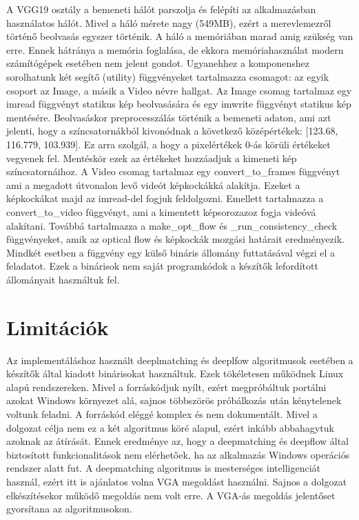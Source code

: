 \documentclass[12pt, a4paper, oneside]{book}
\theoremstyle{tetel}
\newcommand\secro[1]{%
	\addcontentsline{tce}{section}{\protect\makebox[2.8em][l]{\thesection.}#1}}
\newcommand\secen[1]{%
	 \addcontentsline{tcen}{section}{\protect\makebox[2.8em][l]{\thesection.}#1}}
\begin{document}
A VGG19 osztály a bemeneti hálót parszolja és felépíti az alkalmazásban használatos hálót. Mivel a háló mérete nagy (549MB), ezért a merevlemezről történő beolvasás egyszer történik. A háló a memóriában marad amig szükség van erre. Ennek hátránya a memória foglalása, de ekkora memóriahasználat modern számítógépek esetében nem jelent gondot.
\newline
\indent
Ugyanehhez a komponenshez sorolhatunk két segítő (utility) függvényeket tartalmazza csomagot: az egyik csoport az Image, a másik a Video névre hallgat.
\newline
\indent
Az Image csomag tartalmaz egy imread függvényt statikus kép beolvasására és egy imwrite függvényt statikus kép mentésére. Beolvasáskor preprocesszálás történik a bemeneti adaton, ami azt jelenti, hogy a színcsatornákból kivonódnak a következő középértékek: [123.68, 116.779, 103.939]. Ez arra szolgál, a hogy a pixelértékek 0-ás körüli értékeket vegyenek fel. Mentéskör ezek az értékeket hozzáadjuk a kimeneti kép színcsatornáihoz.
\newline
\indent
A Video csomag tartalmaz egy convert\_to\_frames függvényt ami a megadott útvonalon levő videót képkockákká alakítja. Ezeket a képkockákat majd az imread-del fogjuk feldolgozni. Emellett tartalmazza a convert\_to\_video függvényt, ami a kimentett képsorozazoz fogja videóvá alakítani. Továbbá tartalmazza a make\_opt\_flow és \_run\_consistency\_check függvényeket, amik az optical flow és képkockák mozgási határait eredményezik. Mindkét esetben a függvény egy külső bináris állomány futtatásával végzi el a feladatot. Ezek a binárisok nem saját programkódok a készítők lefordított állományait használtuk fel\cite{34}.

\section{Limitációk}
\secro{Limitații}
\secen{Limitations}
Az implementáláshoz használt deeplmatching és deeplfow algoritmusok esetében a készítők által kiadott binárisokat használtuk. Ezek tökéletesen működnek Linux alapú rendszereken. Mivel a forráskódjuk nyílt, ezért megpróbáltuk portálni azokat Windows környezet alá, sajnos többszörös próbálkozás után kénytelenek voltunk feladni. A forráskód eléggé komplex és nem dokumentált. Mivel a dolgozat célja nem ez a két algoritmus köré alapul, ezért inkább abbahagytuk azoknak az átírását. Ennek eredménye az, hogy a deepmatching és deepflow által biztosított funkcionalitások nem elérhetőek, ha az alkalmazás Windows operációs rendszer alatt fut.
\newline
\indent
A deepmatching algoritmus is mesterséges intelligenciát használ, ezért itt is ajánlatos volna VGA megoldást használni. Sajnos a dolgozat elkészítésekor működő megoldás nem volt erre. A VGA-ás megoldás jelentőset gyorsítana az algoritmusokon.
\end{document}
